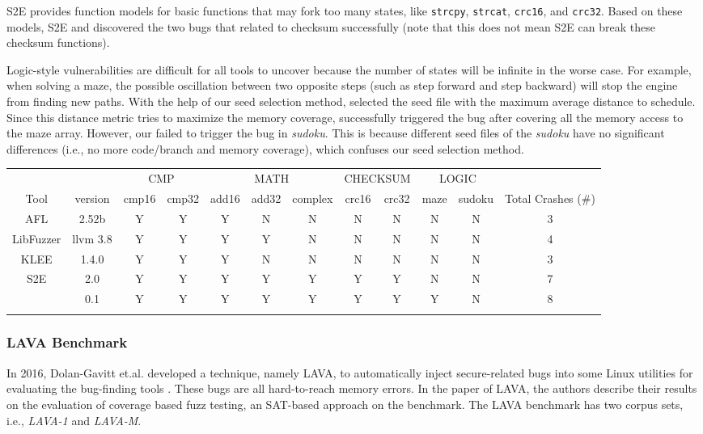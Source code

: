 S2E provides function models for basic functions that may fork too 
many states, like \texttt{strcpy}, \texttt{strcat}, \texttt{crc16},
 and \texttt{crc32}. Based on these models, S2E and \prototype 
 discovered the two bugs that related to checksum successfully 
 (note that this does not mean S2E can break these checksum functions). 

Logic-style vulnerabilities are difficult for all tools to uncover 
because the number of states will be infinite in the worse case.
For example, when solving a maze, the possible oscillation between 
two opposite steps (such as step forward and step backward) 
will stop the engine from finding new paths.
With the help of our seed selection method, \prototype selected 
the seed file with the maximum average distance to schedule. 
Since this distance metric tries to maximize the memory coverage, 
\prototype successfully triggered the bug after covering all 
the memory access to the maze array. 
However, our \prototype failed to trigger the bug in \textit{sudoku}. 
This is because different seed files of the \textit{sudoku} have no 
significant differences (i.e., no more code/branch and memory coverage), 
which confuses our seed selection method.

\begin{table}[!t]
{\begin{tabular*}{20pc}{cccccccccccc}\toprule
	&& \multicolumn{2}{c}{CMP}  & \multicolumn{3}{c}{MATH} & \multicolumn{2}{c}{CHECKSUM} 
	& 	\multicolumn{2}{c}{LOGIC} & \\ 
	    Tool & version & cmp16 & cmp32 & add16 & add32 & complex & crc16 & 
	    crc32 & maze & sudoku & Total Crashes (\#) \\
\midrule
		AFL 		& 2.52b	& Y & Y & Y & N & N & N & N & N & N & 3 \\
		LibFuzzer	& llvm 3.8	& Y & Y & Y & Y & N & N & N & N & N & 4\\
		KLEE		& 1.4.0	& Y & Y & Y & N & N & N & N & N & N & 3\\
		S2E			& 2.0	& Y & Y & Y & Y & Y & Y & Y & N & N & 7\\
		\prototype	& 0.1	& Y & Y & Y & Y & Y & Y & Y & Y & N & 8\\
\botrule
\end{tabular*}}{}
\end{table}

\subsubsection{LAVA Benchmark}
In 2016, Dolan-Gavitt et.al. developed a technique, namely LAVA, to 
automatically inject secure-related bugs into some Linux utilities for 
evaluating the bug-finding tools \cite{dolan2016lava}. These bugs are 
all hard-to-reach memory errors. In the paper of LAVA, the authors describe 
their results on the evaluation of coverage based fuzz testing, an SAT-based 
approach on the benchmark. The LAVA benchmark has two corpus sets, 
i.e., \textit{LAVA-1} and \textit{LAVA-M}.

